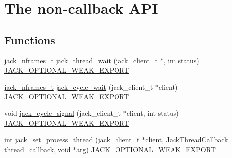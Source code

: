 \hypertarget{group__NonCallbackAPI}{\section{\-The non-\/callback \-A\-P\-I}
\label{dc/d0f/group__NonCallbackAPI}
}
\subsection*{\-Functions}
\begin{DoxyCompactItemize}
\item 
\hyperlink{types_8h_aa954df532e901ae5172e68a23f3da9b6}{jack\-\_\-nframes\-\_\-t} \hyperlink{group__NonCallbackAPI_ga86dc8141bad2b111e2a753ec3fa3af26}{jack\-\_\-thread\-\_\-wait} (jack\-\_\-client\-\_\-t $\ast$, int status) \hyperlink{weakmacros_8h_adf1bde0dd996bbf61a44311165014dd1}{\-J\-A\-C\-K\-\_\-\-O\-P\-T\-I\-O\-N\-A\-L\-\_\-\-W\-E\-A\-K\-\_\-\-E\-X\-P\-O\-R\-T}
\item 
\hyperlink{types_8h_aa954df532e901ae5172e68a23f3da9b6}{jack\-\_\-nframes\-\_\-t} \hyperlink{group__NonCallbackAPI_gabf0867ccf1ba257d84455d95ef3e1632}{jack\-\_\-cycle\-\_\-wait} (jack\-\_\-client\-\_\-t $\ast$client) \hyperlink{weakmacros_8h_adf1bde0dd996bbf61a44311165014dd1}{\-J\-A\-C\-K\-\_\-\-O\-P\-T\-I\-O\-N\-A\-L\-\_\-\-W\-E\-A\-K\-\_\-\-E\-X\-P\-O\-R\-T}
\item 
void \hyperlink{group__NonCallbackAPI_ga4da168f4fb79585b19bc40db3bb06409}{jack\-\_\-cycle\-\_\-signal} (jack\-\_\-client\-\_\-t $\ast$client, int status) \hyperlink{weakmacros_8h_adf1bde0dd996bbf61a44311165014dd1}{\-J\-A\-C\-K\-\_\-\-O\-P\-T\-I\-O\-N\-A\-L\-\_\-\-W\-E\-A\-K\-\_\-\-E\-X\-P\-O\-R\-T}
\item 
int \hyperlink{group__NonCallbackAPI_ga4aacb70f0e10eb6b9db9d58c415d8633}{jack\-\_\-set\-\_\-process\-\_\-thread} (jack\-\_\-client\-\_\-t $\ast$client, \-Jack\-Thread\-Callback thread\-\_\-callback, void $\ast$arg) \hyperlink{weakmacros_8h_adf1bde0dd996bbf61a44311165014dd1}{\-J\-A\-C\-K\-\_\-\-O\-P\-T\-I\-O\-N\-A\-L\-\_\-\-W\-E\-A\-K\-\_\-\-E\-X\-P\-O\-R\-T}
\end{DoxyCompactItemize}



